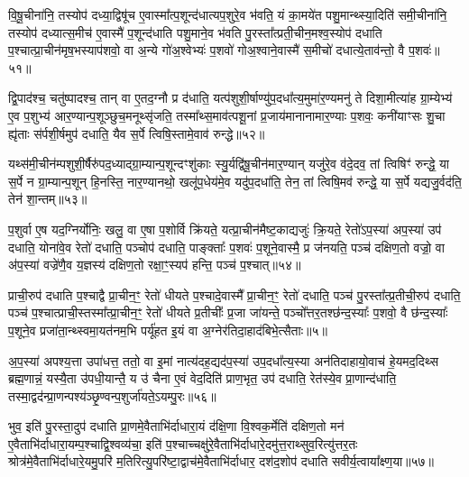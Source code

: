 वि॒षू॒चीना॑नि॒ तस्योप॑ दध्या॒द्विषू॑च ए॒वास्मा᳚त्प॒शून्द॑धात्यप॒शुरे॒व भ॑वति॒ यं का॒मये॑त पशु॒मान्थ्स्या॒दिति॑ समी॒चीना॑नि॒ तस्योप॑ दध्यात्स॒मीच॑ ए॒वास्मै॑ प॒शून्द॑धाति पशु॒माने॒व भ॑वति पु॒रस्ता᳚त्प्रती॒चीन॒मश्व॒स्योप॑ दधाति प॒श्चात्प्रा॒चीन॑मृष॒भस्याप॑शवो॒ वा अ॒न्ये गो॑अ॒श्वेभ्यः॑ प॒शवो॑ गोअ॒श्वाने॒वास्मै॑ स॒मीचो॑ दधात्ये॒ताव॑न्तो॒ वै प॒शवः॑॥५१॥

द्वि॒पाद॑श्च॒ चतु॑ष्पादश्च॒ तान् वा ए॒तद॒ग्नौ प्र द॑धाति॒ यत्प॑शुशी॒र्\mbox{}षाण्यु॑प॒दधा᳚त्य॒मुमा॑र॒ण्यमनु॑ ते दिशा॒मीत्या॑ह ग्रा॒म्येभ्य॑ ए॒व प॒शुभ्य॑ आर॒ण्यान्प॒शूञ्छुच॒मनूथ्सृ॑जति॒ तस्मा᳚थ्स॒माव॑त्पशू॒नां प्र॒जाय॑मानानामार॒ण्याः प॒शवः॒ कनी॑याꣳसः शु॒चा ह्यृ॑ताः स॑र्पशी॒र्\mbox{}षमुप॑ दधाति॒ यैव स॒र्पे त्विषि॒स्तामे॒वाव॑ रुन्द्धे॥५२॥

यथ्स॑मी॒चीन॑म्पशुशी॒र्\mbox{}षैरु॑पद॒ध्याद्ग्रा॒म्यान्प॒शून्दꣳशु॑काः स्यु॒र्यद्वि॑षू॒चीन॑मार॒ण्यान् यजु॑रे॒व व॑दे॒दव॒ तां त्विषिꣳ॑ रुन्द्धे॒ या स॒र्पे न ग्रा॒म्यान्प॒शून् हि॒नस्ति॒ नार॒ण्यानथो॒ खलू॑प॒धेय॑मे॒व यदु॑प॒दधा॑ति॒ तेन॒ तां त्विषि॒मव॑ रुन्द्धे॒ या स॒र्पे यद्यजु॒र्वद॑ति॒ तेन॑ शा॒न्तम्॥५३॥

{\anuvakamend[{ऊ॒नान्तस्योप॑ प्रा॒णाः स्या॒दिति॒ वै प॒शवो॑ रुन्धे॒ चतु॑श्चत्वारिꣳशच्च॥९॥}]}

प॒शुर्वा ए॒ष यद॒ग्निर्योनिः॒ खलु॒ वा ए॒षा प॒शोर्वि क्रि॑यते॒ यत्प्रा॒चीन॑मैष्ट॒काद्यजुः॑ क्रि॒यते॒ रेतो॑\-ऽप॒स्या॑ अप॒स्या॑ उप॑ दधाति॒ योना॑वे॒व रेतो॑ दधाति॒ पञ्चोप॑ दधाति॒ पाङ्क्ताः᳚ प॒शवः॑ प॒शूने॒वास्मै॒ प्र ज॑नयति॒ पञ्च॑ दक्षिण॒तो वज्रो॒ वा अ॑प॒स्या॑ वज्रे॑णै॒व य॒ज्ञस्य॑ दक्षिण॒तो रक्षा॒ꣳ॒स्यप॑ हन्ति॒ पञ्च॑ प॒श्चात्॥५४॥

प्राची॒रुप॑ दधाति प॒श्चाद्वै प्रा॒चीन॒ꣳ॒ रेतो॑ धीयते प॒श्चादे॒वास्मै᳚ प्रा॒चीन॒ꣳ॒ रेतो॑ दधाति॒ पञ्च॑ पु॒रस्ता᳚त्प्र॒तीची॒रुप॑ दधाति॒ पञ्च॑ प॒श्चात्प्राची॒स्तस्मा᳚त्प्रा॒चीन॒ꣳ॒ रेतो॑ धीयते प्र॒तीचीः᳚ प्र॒जा जा॑यन्ते॒ पञ्चो᳚त्तर॒तश्छ॑न्द॒स्याः᳚ प॒शवो॒ वै छ॑न्द॒स्याः᳚ प॒शूने॒व प्रजा॑ता॒न्थ्स्वमा॒यत॑नम॒भि पर्यू॑हत इ॒यं वा अ॒ग्नेर॑तिदा॒हाद॑बिभे॒त्सैताः॥५॥

अ॒प॒स्या॑ अपश्य॒त्ता उपा॑धत्त॒ ततो॒ वा इ॒मां नात्य॑दह॒द्यद॑प॒स्या॑ उप॒दधा᳚त्य॒स्या अन॑तिदाहायो॒वाच॑ हे॒यमद॒दिथ्स ब्रह्म॒णान्नं॒ यस्यै॒ता उ॑पधी॒यान्तै॒ य उ॑ चैना ए॒वं वेद॒दिति॑ प्राण॒भृत॒ उप॑ दधाति॒ रेत॑स्ये॒व प्रा॒णान्द॑धाति॒ तस्मा॒द्वद॑न्प्रा॒णन्पश्य॑ञ्छृ॒ण्वन्प॒शुर्जा॑यते॒\-ऽयम्पु॒रः॥५६॥

भुव॒ इति॑ पु॒रस्ता॒दुप॑ दधाति प्रा॒णमे॒वैताभि॑र्दाधारा॒यं द॑क्षि॒णा वि॒श्वक॒र्मेति॑ दक्षिण॒तो मन॑ ए॒वैताभि॑र्दाधारा॒यम्प॒श्चाद्वि॒श्वव्य॑चा॒ इति॑ प॒श्चाच्चक्षु॑रे॒वैताभि॑र्दाधारे॒दमु॑त्त॒राथ्सुव॒रित्यु॑त्तर॒तः श्रोत्र॑मे॒वैताभि॑र्दाधारे॒यमु॒परि॑ म॒तिरित्यु॒परि॑ष्टा॒द्वाच॑मे॒वैताभि॑र्दाधार॒ दश॑द॒शोप॑ दधाति सवीर्य॒त्वाया᳚क्ष्ण॒या॥५७॥

